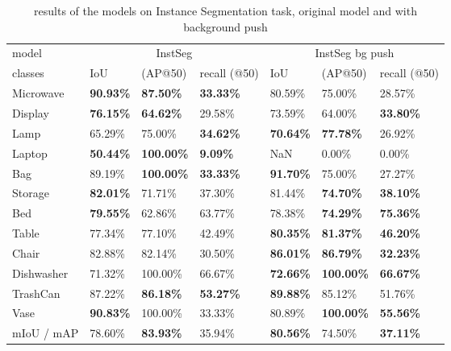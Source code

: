 \begin{table}[!htb]
\caption{results of the models on Instance Segmentation task, original model and with background push}
\begin{tabular}{l|lll|lll}
model & \multicolumn{3}{c}{InstSeg} & \multicolumn{3}{c}{InstSeg bg push} \\
classes & IoU & (AP@50) & recall (@50) & IoU & (AP@50) & recall (@50) \\
\hline
Microwave & \textbf{90.93\%} & \textbf{87.50\%} & \textbf{33.33\%} & 80.59\% & 75.00\% & 28.57\% \\
Display & \textbf{76.15\%} & \textbf{64.62\%} & 29.58\% & 73.59\% & 64.00\% & \textbf{33.80\%} \\
Lamp & 65.29\% & 75.00\% & \textbf{34.62\%} & \textbf{70.64\%} & \textbf{77.78\%} & 26.92\% \\
Laptop & \textbf{50.44\%} & \textbf{100.00\%} & \textbf{9.09\%} & NaN & 0.00\% & 0.00\% \\
Bag & 89.19\% & \textbf{100.00\%} & \textbf{33.33\%} & \textbf{91.70\%} & 75.00\% & 27.27\% \\
Storage & \textbf{82.01\%} & 71.71\% & 37.30\% & 81.44\% & \textbf{74.70\%} & \textbf{38.10\%} \\
Bed & \textbf{79.55\%} & 62.86\% & 63.77\% & 78.38\% & \textbf{74.29\%} & \textbf{75.36\%} \\
Table & 77.34\% & 77.10\% & 42.49\% & \textbf{80.35\%} & \textbf{81.37\%} & \textbf{46.20\%} \\
Chair & 82.88\% & 82.14\% & 30.50\% & \textbf{86.01\%} & \textbf{86.79\%} & \textbf{32.23\%} \\
Dishwasher & 71.32\% & 100.00\% & 66.67\% & \textbf{72.66\%} & \textbf{100.00\%} & \textbf{66.67\%} \\
TrashCan & 87.22\% & \textbf{86.18\%} & \textbf{53.27\%} & \textbf{89.88\%} & 85.12\% & 51.76\% \\
Vase & \textbf{90.83\%} & 100.00\% & 33.33\% & 80.89\% & \textbf{100.00\%} & \textbf{55.56\%} \\
\hline
mIoU / mAP & 78.60\% & \textbf{83.93\%} & 35.94\% & \textbf{80.56\%} & 74.50\% & \textbf{37.11\%}
\end{tabular}%
\label{tab:lod1instsegresults}
\end{table}


